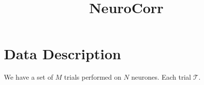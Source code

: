 \documentclass{revtex4}
\begin{document}
\title{NeuroCorr}
\maketitle

\section{Data Description}
We have a set of $M$ trials performed on $N$ neurones.
Each trial $\mathcal{T}$.
\end{document}
